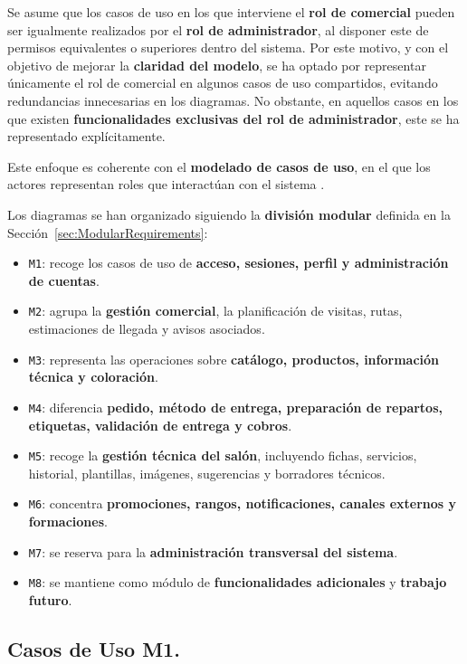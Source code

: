 Se asume que los casos de uso en los que interviene el \textbf{rol de comercial} pueden ser igualmente realizados por el \textbf{rol de administrador}, al disponer este de permisos equivalentes o superiores dentro del sistema. Por este motivo, y con el objetivo de mejorar la \textbf{claridad del modelo}, se ha optado por representar únicamente el rol de comercial en algunos casos de uso compartidos, evitando redundancias innecesarias en los diagramas. No obstante, en aquellos casos en los que existen \textbf{funcionalidades exclusivas del rol de administrador}, este se ha representado explícitamente.

Este enfoque es coherente con el \textbf{modelado de casos de uso}, en el que los actores representan roles que interactúan con el sistema \citep[Ch.~4]{sommerville}.

\bigskip

Los diagramas se han organizado siguiendo la \textbf{división modular} definida en la Sección~\ref{sec:ModularRequirements}:

\begin{itemize}
    \item \texttt{M1}: recoge los casos de uso de \textbf{acceso, sesiones, perfil y administración de cuentas}.
    \item \texttt{M2}: agrupa la \textbf{gestión comercial}, la planificación de visitas, rutas, estimaciones de llegada y avisos asociados.
    \item \texttt{M3}: representa las operaciones sobre \textbf{catálogo, productos, información técnica y coloración}.
    \item \texttt{M4}: diferencia \textbf{pedido, método de entrega, preparación de repartos, etiquetas, validación de entrega y cobros}.
    \item \texttt{M5}: recoge la \textbf{gestión técnica del salón}, incluyendo fichas, servicios, historial, plantillas, imágenes, sugerencias y borradores técnicos.
    \item \texttt{M6}: concentra \textbf{promociones, rangos, notificaciones, canales externos y formaciones}.
    \item \texttt{M7}: se reserva para la \textbf{administración transversal del sistema}.
    \item \texttt{M8}: se mantiene como módulo de \textbf{funcionalidades adicionales} y \textbf{trabajo futuro}.
\end{itemize}

\newpage{\ }
\subsection{Casos de Uso M1.}

